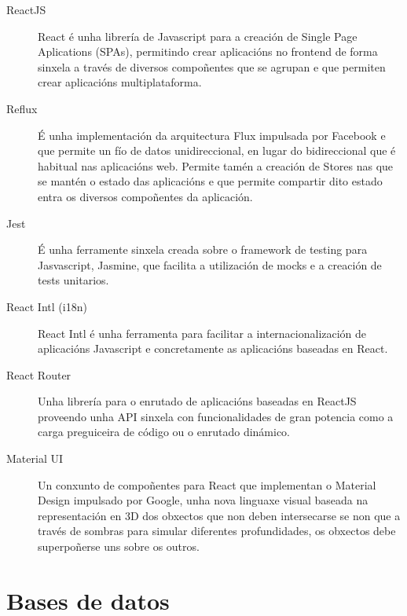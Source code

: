  \begin{description}
   \item [ReactJS] React é unha librería de Javascript para a creación de Single Page 
Aplications (SPAs), permitindo crear aplicacións no frontend de forma sinxela a través de 
diversos compoñentes que se agrupan e que permiten crear aplicacións multiplataforma.
   
   \item [Reflux] É unha implementación da arquitectura Flux impulsada por Facebook e que 
permite un fío de datos unidireccional, en lugar do bidireccional que é habitual nas 
aplicacións web.
    Permite tamén a creación de Stores nas que se mantén o estado das aplicacións e que 
permite compartir dito estado entra os diversos compoñentes da aplicación.
   
   \item [Jest] É unha ferramente sinxela creada sobre o framework de testing 
para Jasvascript, Jasmine, que facilita a utilización de mocks e a creación de 
tests unitarios.

   \item [React Intl (i18n)] React Intl é unha ferramenta para facilitar a 
internacionalización de aplicacións Javascript e concretamente as 
aplicacións baseadas en React.
   
   \item [React Router] Unha librería para o enrutado de aplicacións baseadas en ReactJS 
proveendo unha API sinxela con funcionalidades de gran potencia como a carga preguiceira 
de código ou o enrutado dinámico.
   
   \item [Material UI] Un conxunto de compoñentes para React que implementan o Material 
Design impulsado por Google, unha nova linguaxe visual baseada na representación en 3D 
dos obxectos que non deben intersecarse se non que a través de sombras para simular 
diferentes profundidades, os obxectos debe superpoñerse uns sobre os outros.
   
  \end{description}

  \section{Bases de datos}

